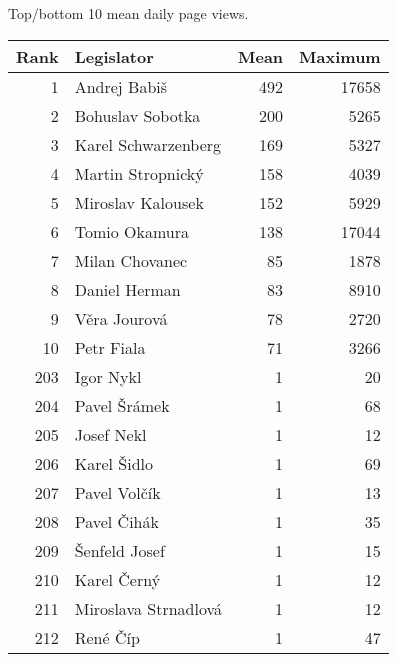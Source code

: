\centering
\caption{Top/bottom 10 mean daily page views.\label{tab:pageviewstopcze}} 
\begingroup\scriptsize
\begin{tabular}{rlrr}
  \toprule
Rank & Legislator & Mean & Maximum \\ 
  \midrule
1 & Andrej Babiš & 492 & 17658 \\ 
  2 & Bohuslav Sobotka & 200 & 5265 \\ 
  3 & Karel Schwarzenberg & 169 & 5327 \\ 
  4 & Martin Stropnický & 158 & 4039 \\ 
  5 & Miroslav Kalousek & 152 & 5929 \\ 
   \midrule
6 & Tomio Okamura & 138 & 17044 \\ 
  7 & Milan Chovanec & 85 & 1878 \\ 
  8 & Daniel Herman & 83 & 8910 \\ 
  9 & Věra Jourová & 78 & 2720 \\ 
  10 & Petr Fiala & 71 & 3266 \\ 
   \midrule
203 & Igor Nykl & 1 & 20 \\ 
  204 & Pavel Šrámek & 1 & 68 \\ 
  205 & Josef Nekl & 1 & 12 \\ 
  206 & Karel Šidlo & 1 & 69 \\ 
  207 & Pavel Volčík & 1 & 13 \\ 
   \midrule
208 & Pavel Čihák & 1 & 35 \\ 
  209 & Šenfeld Josef & 1 & 15 \\ 
  210 & Karel Černý & 1 & 12 \\ 
  211 & Miroslava Strnadlová & 1 & 12 \\ 
  212 & René Číp & 1 & 47 \\ 
   \bottomrule
\end{tabular}
\endgroup

